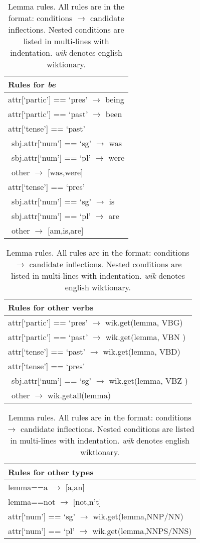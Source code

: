 \documentclass[11pt]{article}
\begin{document}
\begin{table}[t]
\centering
\footnotesize
\begin{tabularx}{.45\textwidth}{|X|}
\hline 
\textbf{Rules for {\it be}} \\ 
\hline 
attr[`partic'] == `pres' $\rightarrow$ being\\ 
attr[`partic'] == `past' $\rightarrow$ been\\ 
attr[`tense'] == `past'\\ 
$\>\>$sbj.attr[`num'] == `sg' $\rightarrow$ was\\ 
$\>\>$sbj.attr[`num'] == `pl' $\rightarrow$ were\\ 
$\>\>$other $\rightarrow$ [was,were]\\ 
attr[`tense'] == `pres'\\ 
$\>\>$sbj.attr[`num'] == `sg' $\rightarrow$ is\\ 
$\>\>$sbj.attr[`num'] == `pl' $\rightarrow$ are\\ 
$\>\>$other $\rightarrow$ [am,is,are]  \\ 
\hline 
\end{tabularx} 

\begin{tabularx}{.45\textwidth}{|X|}
\hline 
\textbf{Rules for other verbs} \\ 
\hline 
attr[`partic'] == `pres' $\rightarrow$ wik.get(lemma, VBG) \\
attr[`partic'] == `past' $\rightarrow$ wik.get(lemma, VBN ) \\
attr[`tense'] == `past' $\rightarrow$ wik.get(lemma, VBD) \\
attr[`tense'] == `pres' \\
$\>\>$sbj.attr[`num'] == `sg' $\rightarrow$ wik.get(lemma, VBZ )\\
$\>\>$other $\rightarrow$ wik.getall(lemma) \\
\hline 
\end{tabularx} 

\begin{tabularx}{.45\textwidth}{|X|}
\hline 
\textbf{Rules for other types} \\ 
\hline 
lemma==a $\rightarrow$ [a,an] \\
lemma==not $\rightarrow$ [not,n't] \\
attr[`num'] == `sg' $\rightarrow$ wik.get(lemma,NNP/NN) \\ 
attr[`num'] == `pl' $\rightarrow$ wik.get(lemma,NNPS/NNS) \\ 
\hline 
\end{tabularx} 
\caption{Lemma rules. All rules are in the format: conditions $\rightarrow$ candidate inflections. Nested conditions are listed in multi-lines with indentation. {\it wik} denotes english wiktionary.}
\label{tbl-morphology-generation}
\end{table}
\end{document}
